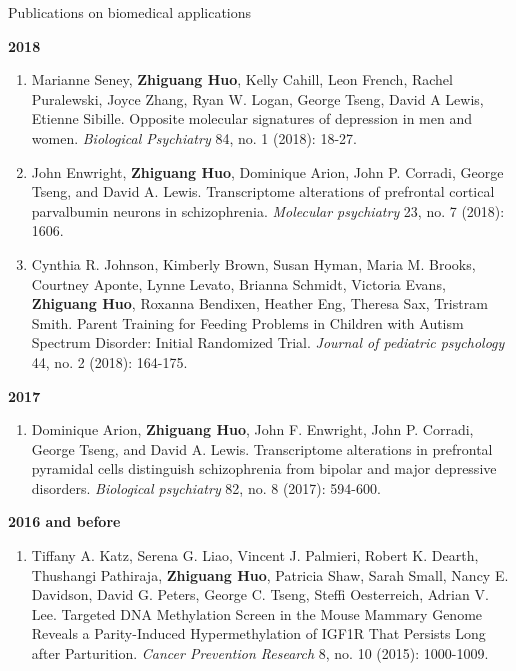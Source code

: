 \documentclass{resume} %
\begin{document}
\begin{rSection}{Publications on biomedical applications}
\begin{enumerate}[noitemsep,topsep=0pt,resume]
\end{enumerate}

\textbf{2018}
\begin{enumerate}[noitemsep,topsep=0pt, resume]

\item Marianne Seney,  {\bf Zhiguang Huo},  Kelly Cahill, Leon French, Rachel Puralewski, Joyce Zhang, Ryan W. Logan, George Tseng, David A Lewis, Etienne Sibille. Opposite molecular signatures of depression in men and women. \emph{Biological Psychiatry}  84, no. 1 (2018): 18-27.

\item 
John Enwright, {\bf Zhiguang Huo}, Dominique Arion, John P. Corradi, George Tseng, and David A. Lewis. 
Transcriptome alterations of prefrontal cortical parvalbumin neurons in schizophrenia. 
\emph{Molecular psychiatry} 23, no. 7 (2018): 1606.

\item 
Cynthia R. Johnson, Kimberly Brown, Susan Hyman, Maria M. Brooks, Courtney Aponte, Lynne Levato, Brianna Schmidt,
Victoria Evans, {\bf Zhiguang Huo},  Roxanna Bendixen, Heather Eng, Theresa Sax, Tristram Smith.
Parent Training for Feeding Problems in Children with Autism Spectrum Disorder: Initial Randomized Trial. \emph{Journal of pediatric psychology} 44, no. 2 (2018): 164-175.

\end{enumerate}

\textbf{2017}
\begin{enumerate}[noitemsep,topsep=0pt, resume]

\item  
Dominique Arion, {\bf Zhiguang Huo}, John F. Enwright, John P. Corradi, George Tseng, and David A. Lewis. Transcriptome alterations in prefrontal pyramidal cells distinguish schizophrenia from bipolar and major depressive disorders. \emph{Biological psychiatry} 82, no. 8 (2017): 594-600.

\end{enumerate}



\textbf{2016 and before}
\begin{enumerate}[noitemsep,topsep=0pt,resume]

    \item Tiffany A. Katz, Serena G. Liao, Vincent J. Palmieri, Robert K. Dearth, Thushangi Pathiraja, {\bf Zhiguang Huo}, Patricia Shaw, Sarah Small, Nancy E. Davidson, David G. Peters, George C. Tseng, Steffi Oesterreich, Adrian V. Lee. Targeted DNA Methylation Screen in the Mouse Mammary Genome Reveals a Parity-Induced Hypermethylation of IGF1R That Persists Long after Parturition. \emph{Cancer Prevention Research} 8, no. 10 (2015): 1000-1009.


\end{enumerate}
\end{rSection}
\end{document}
